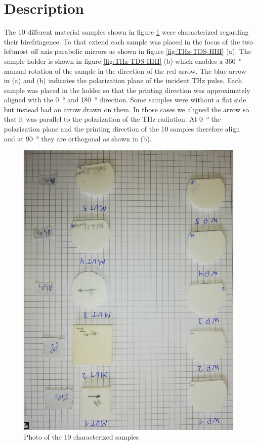 \section{Description}
The 10 different material samples shown in figure \ref{fig:ceramic_samples} were characterized regarding their birefringence. To that extend each sample was placed in the focus of the two leftmost off axis parabolic mirrors as shown in figure \ref{fig:THz-TDS-HHI} (a). The sample holder is shown in figure \ref{fig:THz-TDS-HHI} (b) which enables a \SI{360}{\degree} manual rotation of the sample in the direction of the red arrow. The blue arrow in (a) and (b) indicates the polarization plane of the incident THz pulse. Each sample was placed in the holder so that the printing direction was approximately aligned with the \SI{0}{\degree} and \SI{180}{\degree} direction. Some samples were without a flat side but instead had an arrow drawn on them. In those cases we aligned the arrow so that it was parallel to the polarization of the THz radiation. At \SI{0}{\degree} the polarization plane and the printing direction of the 10 samples therefore align and at \SI{90}{\degree} they are orthogonal as shown in (b). 

\begin{figure}
    \centering
    \includegraphics[scale=0.1,angle=180,origin=c]{images/7_appendix/ceramic_samples.jpg}
    \caption{Photo of the 10 characterized samples}
    \label{fig:ceramic_samples}
\end{figure}

